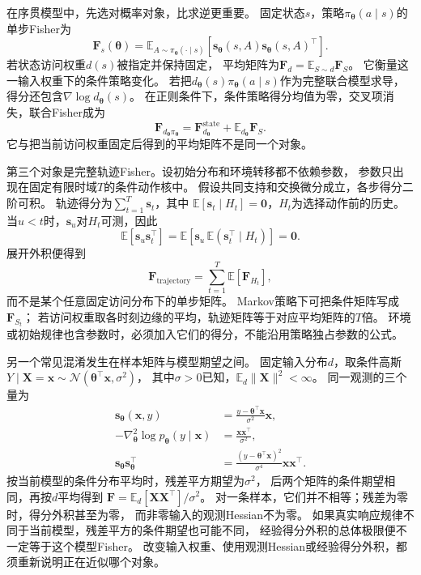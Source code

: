 在序贯模型中，先选对概率对象，比求逆更重要。
固定状态\(s\)，策略\(\pi_{\bm\theta}(a\mid s)\)的单步Fisher为
\[
  \bm F_s(\bm\theta)
  =\mathbb E_{A\sim\pi_{\bm\theta}(\cdot\mid s)}
    [\bm s_{\bm\theta}(s,A)\bm s_{\bm\theta}(s,A)^\top].
\]
若状态访问权重\(d(s)\)被指定并保持固定，
平均矩阵为\(\bm F_d=\mathbb E_{S\sim d}\bm F_S\)。
它衡量这一输入权重下的条件策略变化。
若把\(d_{\bm\theta}(s)\pi_{\bm\theta}(a\mid s)\)作为完整联合模型求导，
得分还包含\(\nabla\log d_{\bm\theta}(s)\)。
在正则条件下，条件策略得分均值为零，交叉项消失，联合Fisher成为
\[
  \bm F_{d_{\bm\theta}\pi_{\bm\theta}}
  =\bm F_{d_{\bm\theta}}^{\mathrm{state}}
    +\mathbb E_{d_{\bm\theta}}\bm F_S.
\]
它与把当前访问权重固定后得到的平均矩阵不是同一个对象。

第三个对象是完整轨迹Fisher。设初始分布和环境转移都不依赖参数，
参数只出现在固定有限时域\(T\)的条件动作核中。
假设共同支持和交换微分成立，各步得分二阶可积。
轨迹得分为\(\sum_{t=1}^T\bm s_t\)，其中
\(\mathbb E[\bm s_t\mid H_t]=\bm0\)，\(H_t\)为选择动作前的历史。
当\(u<t\)时，\(\bm s_u\)对\(H_t\)可测，因此
\[
  \mathbb E[\bm s_u\bm s_t^\top]
  =\mathbb E[\bm s_u\,\mathbb E(\bm s_t^\top\mid H_t)]=\bm0.
\]
展开外积便得到
\[
  \bm F_{\mathrm{trajectory}}
  =\sum_{t=1}^T\mathbb E[\bm F_{H_t}],
\]
而不是某个任意固定访问分布下的单步矩阵。
Markov策略下可把条件矩阵写成\(\bm F_{S_t}\)；
若访问权重取各时刻边缘的平均，轨迹矩阵等于对应平均矩阵的\(T\)倍。
环境或初始规律也含参数时，必须加入它们的得分，不能沿用策略独占参数的公式。

另一个常见混淆发生在样本矩阵与模型期望之间。
固定输入分布\(d\)，取条件高斯
\(Y\mid\bm X=\bm x\sim\mathcal N(\bm\theta^\top\bm x,\sigma^2)\)，
其中\(\sigma>0\)已知，\(\mathbb E_d\|\bm X\|^2<\infty\)。
同一观测的三个量为
\[
\begin{aligned}
  \bm s_{\bm\theta}(\bm x,y)
    &=\frac{y-\bm\theta^\top\bm x}{\sigma^2}\bm x,\\
  -\nabla^2_{\bm\theta}\log p_{\bm\theta}(y\mid\bm x)
    &=\frac{\bm x\bm x^\top}{\sigma^2},\\
  \bm s_{\bm\theta}\bm s_{\bm\theta}^\top
    &=\frac{(y-\bm\theta^\top\bm x)^2}{\sigma^4}\bm x\bm x^\top.
\end{aligned}
\]
按当前模型的条件分布平均时，残差平方期望为\(\sigma^2\)，
后两个矩阵的条件期望相同，再按\(d\)平均得到
\(\bm F=\mathbb E_d[\bm X\bm X^\top]/\sigma^2\)。
对一条样本，它们并不相等；残差为零时，得分外积甚至为零，
而非零输入的观测Hessian不为零。
如果真实响应规律不同于当前模型，残差平方的条件期望也可能不同，
经验得分外积的总体极限便不一定等于这个模型Fisher。
改变输入权重、使用观测Hessian或经验得分外积，都须重新说明正在近似哪个对象。

